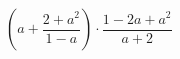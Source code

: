 \begin{ex}[type=expression]
	\begin{condition}
		\( \left( a+\dfrac{2+a^2}{1-a} \right)\cdot\dfrac{1-2a+a^2}{a+2} \)
	\end{condition}
\end{ex}